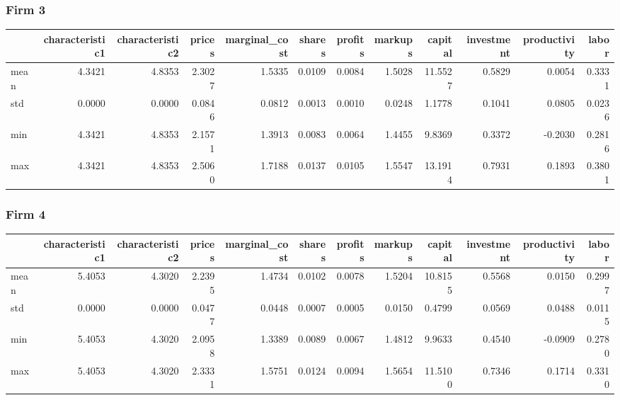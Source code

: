  \subsubsection*{Firm 3}
\begin{tabular}{lrrrrrrrrrrr}
\toprule
{} &  characteristic1 &  characteristic2 &  prices &  marginal\_cost &  shares &  profits &  markups &  capital &  investment &  productivity &  labor \\
\midrule
mean &           4.3421 &           4.8353 &  2.3027 &         1.5335 &  0.0109 &   0.0084 &   1.5028 &  11.5527 &      0.5829 &        0.0054 & 0.3331 \\
std  &           0.0000 &           0.0000 &  0.0846 &         0.0812 &  0.0013 &   0.0010 &   0.0248 &   1.1778 &      0.1041 &        0.0805 & 0.0236 \\
min  &           4.3421 &           4.8353 &  2.1571 &         1.3913 &  0.0083 &   0.0064 &   1.4455 &   9.8369 &      0.3372 &       -0.2030 & 0.2816 \\
max  &           4.3421 &           4.8353 &  2.5060 &         1.7188 &  0.0137 &   0.0105 &   1.5547 &  13.1914 &      0.7931 &        0.1893 & 0.3801 \\
\bottomrule
\end{tabular}


 \subsubsection*{Firm 4}
\begin{tabular}{lrrrrrrrrrrr}
\toprule
{} &  characteristic1 &  characteristic2 &  prices &  marginal\_cost &  shares &  profits &  markups &  capital &  investment &  productivity &  labor \\
\midrule
mean &           5.4053 &           4.3020 &  2.2395 &         1.4734 &  0.0102 &   0.0078 &   1.5204 &  10.8155 &      0.5568 &        0.0150 & 0.2997 \\
std  &           0.0000 &           0.0000 &  0.0477 &         0.0448 &  0.0007 &   0.0005 &   0.0150 &   0.4799 &      0.0569 &        0.0488 & 0.0115 \\
min  &           5.4053 &           4.3020 &  2.0958 &         1.3389 &  0.0089 &   0.0067 &   1.4812 &   9.9633 &      0.4540 &       -0.0909 & 0.2780 \\
max  &           5.4053 &           4.3020 &  2.3331 &         1.5751 &  0.0124 &   0.0094 &   1.5654 &  11.5100 &      0.7346 &        0.1714 & 0.3310 \\
\bottomrule
\end{tabular}


